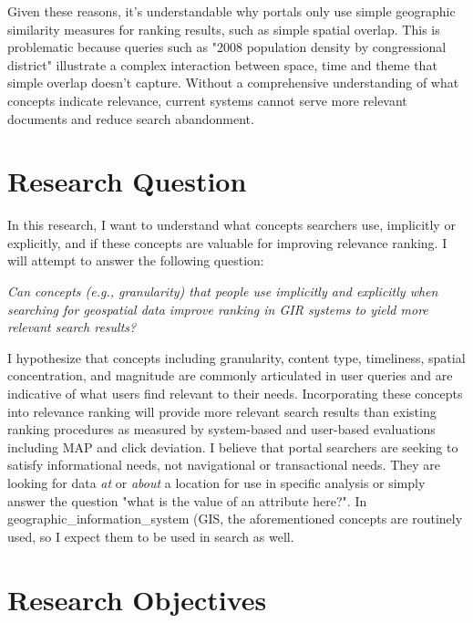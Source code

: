 
Given these reasons, it’s understandable why portals only use simple geographic similarity measures for ranking results, such as simple spatial overlap. This is problematic because queries such as "2008 population density by congressional district" illustrate a complex interaction between space, time and theme that simple overlap doesn't capture. Without a comprehensive understanding of what concepts indicate relevance, current systems cannot serve more relevant documents and reduce search abandonment.

\section{Research Question}

In this research, I want to understand what concepts searchers use, implicitly or explicitly, and if these concepts are valuable for improving relevance ranking. I will attempt to answer the following question:
\linebreak

\emph{Can concepts (e.g., granularity) that people use implicitly and explicitly when searching for geospatial data improve ranking in GIR systems to yield more relevant search results?}
\linebreak

I hypothesize that concepts including granularity, content type, timeliness, spatial concentration, and magnitude are commonly articulated in user queries and are indicative of what users find relevant to their needs. Incorporating these concepts into relevance ranking will provide more relevant search results than existing ranking procedures as measured by system-based and user-based evaluations including MAP and click deviation. I believe that portal searchers are seeking to satisfy informational needs, not navigational or transactional needs. They are looking for data \emph{at} or \emph{about} a location for use in specific analysis or simply answer the question "what is the value of an attribute here?". In \gls{geographic_information_system} (\acrshort{GIS}, the aforementioned concepts are routinely used, so I expect them to be used in search as well.


\section{Research Objectives}

